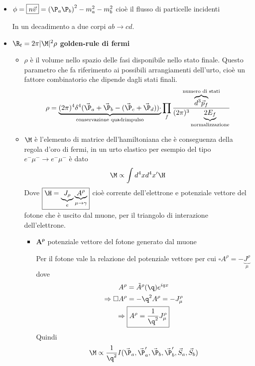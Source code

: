 \documentclass[12pt]{book}
\begin{document}
\begin{itemize}
	\item $\phi =\boxed{n \vec v}= \left( \P_a \P_b \right)^2 - m_a^2 - m_b^2$ cioè il flusso di particelle incidenti

In un decadimento a due corpi $ab \rightarrow cd$. 

\item $\R_t = 2 \pi |\M|^2 \rho$ \textbf{golden-rule di fermi}

\begin{itemize}
	\item $\rho$ è il volume nello spazio delle fasi disponibile nello stato finale. Questo parametro che fa riferimento ai possibili arrangiamenti dell'urto, cioè un fattore combinatorio che dipende dagli stati finali.
\begin{equation}
	\rho = \underbrace{(2 \pi)^4 \delta ^4 (\vec \P_a + \vec \P_b - (\vec \P_c + \vec \P_d))\cdot}_{\text{conservazione quadrimpulso}}  \prod_f \frac{\overbrace{d^3 \vec p_f}^{\text{numero di stati}}}{(2 \pi)^3\underbrace{2E_f}_{\text{\text{normalizzazione}}}}
\end{equation}

\item $\M$ è l'elemento di matrice dell'hamiltoniana che è conseguenza della regola d'oro di fermi, in un urto elastico per esempio del tipo $e^- \mu^- \rightarrow e^- \mu^-$ è dato
\begin{equation}
	\M \propto \int d^4 x d^4x' \H 
\end{equation}
Dove $\boxed{\H = \underbrace{J_\rho}_e \underbrace{A^\rho}_{\mu\rightarrow \gamma}}$ cioè corrente dell'elettrone e potenziale vettore del fotone che è uscito dal muone, per il triangolo di interazione dell'elettrone. 
\begin{itemize}
	\item $\mathbf{A^\rho}$ potenziale vettore del fotone generato dal muone
	
	Per il fotone vale la relazione del potenziale vettore per cui $\square A^\rho = - \underbrace{J^\rho}_\mu$ dove
\begin{gather}
	A^\rho = \tilde A^\rho (\q) e^{iqx} \\\Rightarrow \square A^\rho = - \q^2 A^\rho = - J_\mu ^\rho \\ \Rightarrow \boxed{A^\rho = \frac{1}{\q^2} J^\rho_\mu}
\end{gather}
Quindi 
\begin{equation}
	\M \propto \frac{1}{\q^2} I (\vec \P_a, \vec \P'_a, \vec \P_b, \vec \P'_b, \vec S_a, \vec S_b)
\end{equation}


\end{itemize}
\end{itemize}
\end{itemize}
\end{document}
